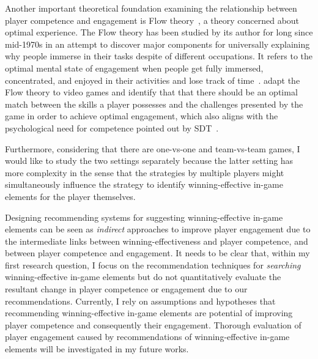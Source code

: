  
Another important theoretical foundation examining the relationship between player competence and engagement is Flow  theory~\cite{flow1990psychology}, a theory concerned about optimal experience. The Flow theory has been studied by its author for long since mid-1970s in an attempt to discover major components for universally explaining why people immerse in their tasks despite of different occupations. It refers to the optimal mental state of engagement when people get fully immersed, concentrated, and enjoyed in their activities and lose track of time~\cite{flow1990psychology}. \cite{sweetser2005gameflow,chen2007flow} adapt the Flow theory to video games and identify that that there should be an optimal match between the skills a player possesses and the challenges presented by the game in order to achieve optimal engagement, which also aligns with the psychological need for competence pointed out by SDT~\cite{ryan2000self}.

Furthermore, considering that there are one-vs-one and team-vs-team games, I would like to study the two settings separately because the latter setting has more complexity in the sense that the strategies by multiple players might simultaneously influence the strategy to identify winning-effective in-game elements for the player themselves. 

Designing recommending systems for suggesting winning-effective in-game elements can be seen as \textit{indirect} approaches to improve player engagement due to the intermediate links between winning-effectiveness and player competence, and between player competence and engagement. It needs to be clear that, within my first research question, I focus on the recommendation techniques for \textit{searching} winning-effective in-game elements but do not quantitatively evaluate the resultant change in player competence or engagement due to our recommendations. Currently, I rely on assumptions and hypotheses that recommending winning-effective in-game elements are potential of improving player competence and consequently their engagement. Thorough evaluation of player engagement caused by recommendations of winning-effective in-game elements will be investigated in my future works.

